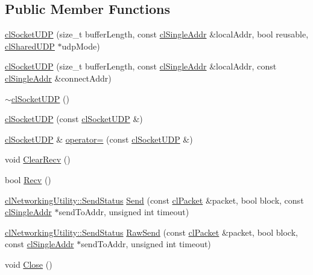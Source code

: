 \subsection*{Public Member Functions}
\begin{DoxyCompactItemize}
\item 
\hyperlink{classcl_socket_u_d_p_a4a632316578eeb0ea1a1c2ac98040640}{clSocketUDP} (size\_\-t bufferLength, const \hyperlink{classcl_single_addr}{clSingleAddr} \&localAddr, bool reusable, \hyperlink{classcl_shared_u_d_p}{clSharedUDP} $\ast$udpMode)
\item 
\hyperlink{classcl_socket_u_d_p_a1bba83c348abf83908a19dcba3add5e1}{clSocketUDP} (size\_\-t bufferLength, const \hyperlink{classcl_single_addr}{clSingleAddr} \&localAddr, const \hyperlink{classcl_single_addr}{clSingleAddr} \&connectAddr)
\item 
\hyperlink{classcl_socket_u_d_p_a3f71836d4fb181524761d515070d2a72}{$\sim$clSocketUDP} ()
\item 
\hyperlink{classcl_socket_u_d_p_a7a6b0f94c67748950d1d4de0b70b29d3}{clSocketUDP} (const \hyperlink{classcl_socket_u_d_p}{clSocketUDP} \&)
\item 
\hyperlink{classcl_socket_u_d_p}{clSocketUDP} \& \hyperlink{classcl_socket_u_d_p_a5f60bc0ffddf52c3b37df07ef8ddd26f}{operator=} (const \hyperlink{classcl_socket_u_d_p}{clSocketUDP} \&)
\item 
void \hyperlink{classcl_socket_u_d_p_a6c7f4b4f575e0c466f6b59d18717bd2a}{ClearRecv} ()
\item 
bool \hyperlink{classcl_socket_u_d_p_a385dad6d067c955acc71c90873cf56d7}{Recv} ()
\item 
\hyperlink{classcl_networking_utility_a19389cda12603396e03caa9d82073803}{clNetworkingUtility::SendStatus} \hyperlink{classcl_socket_u_d_p_ab1464373dcab1e39cc37bf3ee755cb92}{Send} (const \hyperlink{classcl_packet}{clPacket} \&packet, bool block, const \hyperlink{classcl_single_addr}{clSingleAddr} $\ast$sendToAddr, unsigned int timeout)
\item 
\hyperlink{classcl_networking_utility_a19389cda12603396e03caa9d82073803}{clNetworkingUtility::SendStatus} \hyperlink{classcl_socket_u_d_p_a43b0d22e608dcab2e71d376d0bdb5c6a}{RawSend} (const \hyperlink{classcl_packet}{clPacket} \&packet, bool block, const \hyperlink{classcl_single_addr}{clSingleAddr} $\ast$sendToAddr, unsigned int timeout)
\item 
void \hyperlink{classcl_socket_u_d_p_aa4f23e02e1c4803535e94fcfa97698ea}{Close} ()
\item 

\end{DoxyCompactItemize}
